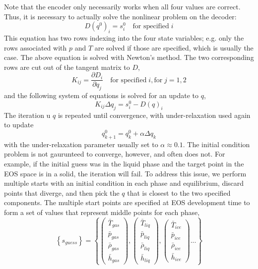 \documentclass[]{article}
\begin{document}
Note that the encoder only necessarily works when all four values are
correct. Thus, it is necessary to actually solve the nonlinear problem
on the decoder:
\[D(q^0)_i = s^0_i \quad \text{for specified}\; i\]
This equation has two rows indexing into the four state variables;
e.g. only the rows associated with $p$ and $T$ are solved if those are
specified, which is usually the case. The above equation is solved
with Newton's method. The two corresponding rows are cut out of
the tangent matrix to $D$,
\[K_{ij} = \frac{\partial D_i}{\partial q_j}  \quad \text{for specified}\; i, \text{for}\;j=1,2\]
and the following system of equations is solved for an update to $q$,
\[K_{ij}\Delta q_j = s^0_i-D(q)_i\]
The iteration u $q$ is repeated until convergence, with under-relaxation used again to update
 \begin{equation}
q^0_{k+1} =q^0_{k} + \alpha \Delta q_{k}
\end{equation}
with the under-relaxation parameter usually set to $\alpha \approx
0.1$.
The initial condition problem is not gaurunteed to converge, however,
and often does not.
For example, if the initial guess was in the liquid phase and the target point
in the EOS space is in a solid, the iteration will fail.
To address this issue, we perform multiple starts with an initial condition in each
phase and equilibrium, discard points that diverge, and then pick the
\(q\) that is closest to the two specified components. The multiple
start points are specified at EOS development time to form a set of
values that represent middle points for each phase,
\begin{equation}
\left\{s_{guess}\right\} = \left\{ \left(\begin{array}{c}
\bar{T}_{gas}\\
\bar{p}_{gas}\\
\bar{\rho}_{gas}\\
\bar{h}_{gas}
\end{array}\right),\left(\begin{array}{c}
\bar{T}_{liq}\\
\bar{p}_{liq}\\
\bar{\rho}_{liq}\\
\bar{h}_{liq}
\end{array}\right),\left(\begin{array}{c}
\bar{T}_{ice}\\
\bar{p}_{ice}\\
\bar{\rho}_{ice}\\
\bar{h}_{ice}
\end{array}\right)... \right\}
  \end{equation}
\end{document}
